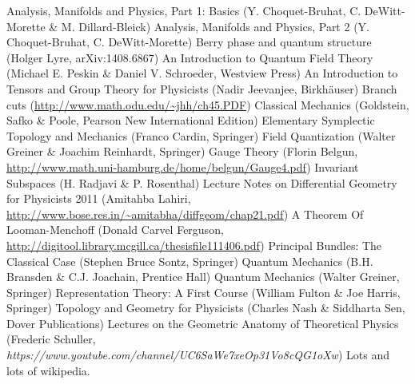 \documentclass[12pt]{report}
\begin{document}
\begin{thebibliography}{99}
	Analysis, Manifolds and Physics, Part 1: Basics (Y. Choquet-Bruhat, C. DeWitt-Morette \& M. Dillard-Bleick)
	Analysis, Manifolds and Physics, Part 2 (Y. Choquet-Bruhat, C. DeWitt-Morette)
	Berry phase and quantum structure (Holger Lyre, arXiv:1408.6867)
	An Introduction to Quantum Field Theory (Michael E. Peskin \& Daniel V. Schroeder, Westview Press)
    	An Introduction to Tensors and Group Theory for Physicists (Nadir Jeevanjee, Birkh\"auser)
    	Branch cuts (\url{http://www.math.odu.edu/~jhh/ch45.PDF})
	Classical Mechanics (Goldstein, Safko \& Poole, Pearson New International Edition)
	Elementary Symplectic Topology and Mechanics (Franco Cardin, Springer)
	Field Quantization (Walter Greiner \& Joachim Reinhardt, Springer)
	Gauge Theory (Florin Belgun, \url{http://www.math.uni-hamburg.de/home/belgun/Gauge4.pdf})
	Invariant Subspaces (H. Radjavi \& P. Rosenthal)
	Lecture Notes on Differential Geometry for Physicists 2011 (Amitahba Lahiri, \url{http://www.bose.res.in/~amitabha/diffgeom/chap21.pdf})
	A Theorem Of Looman-Menchoff (Donald Carvel Ferguson, \url{http://digitool.library.mcgill.ca/thesisfile111406.pdf})
	Principal Bundles: The Classical Case (Stephen Bruce Sontz, Springer)
    	Quantum Mechanics (B.H. Bransden \& C.J. Joachain, Prentice Hall)
    	Quantum Mechanics (Walter Greiner, Springer)
	Representation Theory: A First Course (William Fulton \& Joe Harris, Springer)
	Topology and Geometry for Physicists (Charles Nash \& Siddharta Sen, Dover Publications)
	Lectures on the Geometric Anatomy of Theoretical Physics (Frederic Schuller, \textit{https://www.youtube.com/channel/UC6SaWe7xeOp31Vo8cQG1oXw})
	Lots and lots of wikipedia.
\end{thebibliography}
\printindex
\end{document}
